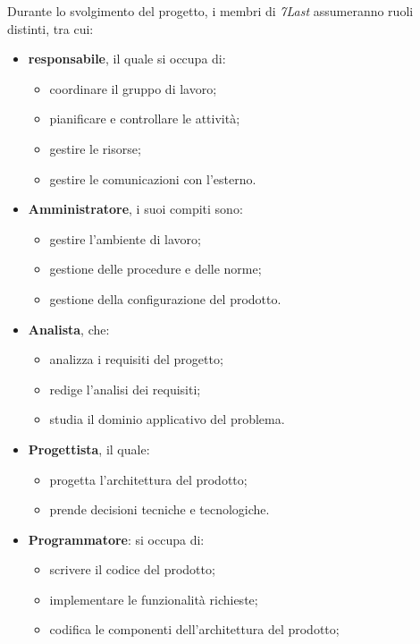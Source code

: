 Durante lo svolgimento del progetto, i membri di \textit{7Last} assumeranno ruoli distinti, tra cui:
\begin{itemize}
    \item \textbf{responsabile}, il quale si occupa di:
        \begin{itemize}
            \item coordinare il gruppo di lavoro;
            \item pianificare e controllare le attività;
            \item gestire le risorse;
            \item gestire le comunicazioni con l'esterno.
        \end{itemize}
    \item \textbf{Amministratore}, i suoi compiti sono:
        \begin{itemize}
            \item gestire l'ambiente di lavoro;
            \item gestione delle procedure e delle norme;
            \item gestione della configurazione del prodotto.
        \end{itemize}
    \item \textbf{Analista}, che:
        \begin{itemize}
            \item analizza i requisiti del progetto;
            \item redige l'analisi dei requisiti;
            \item studia il dominio applicativo del problema.
        \end{itemize}
    \item \textbf{Progettista}, il quale:
        \begin{itemize}
            \item progetta l'architettura del prodotto;
            \item prende decisioni tecniche e tecnologiche.
        \end{itemize}
    \item \textbf{Programmatore}: si occupa di:
        \begin{itemize}
            \item scrivere il codice del prodotto;
            \item implementare le funzionalità richieste;
            \item codifica le componenti dell'architettura del prodotto;

\end{itemize}
\end{itemize}
